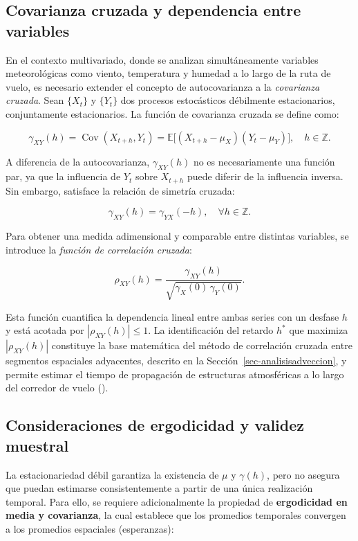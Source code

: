 \documentclass[
  spanish,
  us-letterpaper,
]{scrreprt}
\numberwithin{equation}{section}
\begin{document}
\subsection{Covarianza cruzada y dependencia entre
variables}\label{covarianza-cruzada-y-dependencia-entre-variables}

En el contexto multivariado, donde se analizan simultáneamente variables
meteorológicas como viento, temperatura y humedad a lo largo de la ruta
de vuelo, es necesario extender el concepto de autocovarianza a la
\emph{covarianza cruzada}. Sean \(\{X_t\}\) y \(\{Y_t\}\) dos procesos
estocásticos débilmente estacionarios, conjuntamente estacionarios. La
función de covarianza cruzada se define como:

\[
\gamma_{XY}(h) = \operatorname{Cov}(X_{t+h}, Y_t) = \mathbb{E}\big[(X_{t+h} - \mu_X)(Y_t - \mu_Y)\big], \quad h \in \mathbb{Z}.
\]

A diferencia de la autocovarianza, \(\gamma_{XY}(h)\) no es
necesariamente una función par, ya que la influencia de \(Y_t\) sobre
\(X_{t+h}\) puede diferir de la influencia inversa. Sin embargo,
satisface la relación de simetría cruzada:

\[
\gamma_{XY}(h) = \gamma_{YX}(-h), \quad \forall h \in \mathbb{Z}.
\]

Para obtener una medida adimensional y comparable entre distintas
variables, se introduce la \emph{función de correlación cruzada}:

\[
\rho_{XY}(h) = \frac{\gamma_{XY}(h)}{\sqrt{\gamma_X(0)\,\gamma_Y(0)}}.
\]

Esta función cuantifica la dependencia lineal entre ambas series con un
desfase \(h\) y está acotada por \(|\rho_{XY}(h)| \leq 1\). La
identificación del retardo \(h^*\) que maximiza \(|\rho_{XY}(h)|\)
constituye la base matemática del método de correlación cruzada entre
segmentos espaciales adyacentes, descrito en la
Sección~\ref{sec-analisisadveccion}, y permite estimar el tiempo de
propagación de estructuras atmosféricas a lo largo del corredor de vuelo
().

\subsection{Consideraciones de ergodicidad y validez
muestral}\label{consideraciones-de-ergodicidad-y-validez-muestral}

La estacionariedad débil garantiza la existencia de \(\mu\) y
\(\gamma(h)\), pero no asegura que puedan estimarse consistentemente a
partir de una única realización temporal. Para ello, se requiere
adicionalmente la propiedad de \textbf{ergodicidad en media y
covarianza}, la cual establece que los promedios temporales convergen a
los promedios espaciales (esperanzas):
\end{document}
